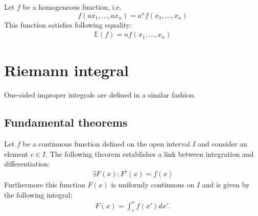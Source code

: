 	\begin{theorem}[Euler]
		Let $f$ be a homogeneous function, i.e. \[f(ax_1, ..., ax_n) = a^nf(x_1, ..., x_n)\] This function satisfies following equality:
		\begin{gather}
			\label{calculus:theorem:euler_homogeneous_functions}
			\mathbb{E}(f) = nf(x_1, ..., x_n)
		\end{gather}
	\end{theorem}

\section{Riemann integral}

        One-sided improper integrals are defined in a similar fashion.

\subsection{Fundamental theorems}
    
	\begin{theorem}
		Let $f$ be a continuous  function defined on the open interval $I$ and consider an element $c \in I$. The following theorem establishes a link between integration and differentiation:
		\begin{gather}
        	        \exists F(x) :F'(x) = f(x)
		\end{gather}
		Furthermore this function $F(x)$ is uniformly continuous on $I$ and is given by the following integral:
		\begin{gather}
			\label{calculus:first_fundamental_theorem}
			F(x) = \int_c^xf(x')dx'.
		\end{gather}
	\end{theorem}
        

